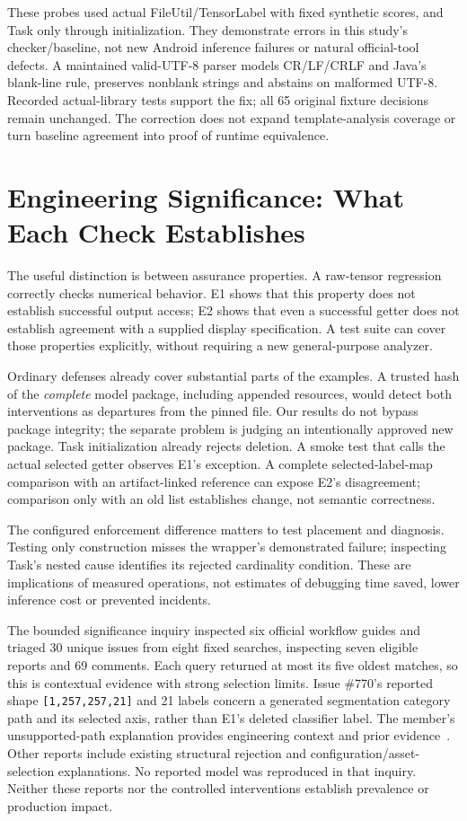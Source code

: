 \documentclass[10pt,twocolumn,letterpaper]{article}
\newcommand{\code}[1]{\texttt{#1}}
\begin{document}
These probes used actual FileUtil/TensorLabel with fixed synthetic scores, and Task only through initialization. They demonstrate errors in this study's checker/baseline, not new Android inference failures or natural official-tool defects. A maintained valid-UTF-8 parser models CR/LF/CRLF and Java's blank-line rule, preserves nonblank strings and abstains on malformed UTF-8. Recorded actual-library tests support the fix; all 65 original fixture decisions remain unchanged. The correction does not expand template-analysis coverage or turn baseline agreement into proof of runtime equivalence.

\section{Engineering Significance: What Each Check Establishes}
\label{sec:discussion}
The useful distinction is between assurance properties. A raw-tensor regression correctly checks numerical behavior. E1 shows that this property does not establish successful output access; E2 shows that even a successful getter does not establish agreement with a supplied display specification. A test suite can cover those properties explicitly, without requiring a new general-purpose analyzer.

Ordinary defenses already cover substantial parts of the examples. A trusted hash of the \emph{complete} model package, including appended resources, would detect both interventions as departures from the pinned file. Our results do not bypass package integrity; the separate problem is judging an intentionally approved new package. Task initialization already rejects deletion. A smoke test that calls the actual selected getter observes E1's exception. A complete selected-label-map comparison with an artifact-linked reference can expose E2's disagreement; comparison only with an old list establishes change, not semantic correctness.

The configured enforcement difference matters to test placement and diagnosis. Testing only construction misses the wrapper's demonstrated failure; inspecting Task's nested cause identifies its rejected cardinality condition. These are implications of measured operations, not estimates of debugging time saved, lower inference cost or prevented incidents.

The bounded significance inquiry inspected six official workflow guides and triaged 30 unique issues from eight fixed searches, inspecting seven eligible reports and 69 comments. Each query returned at most its five oldest matches, so this is contextual evidence with strong selection limits. Issue \#770's reported shape \code{[1,257,257,21]} and 21 labels concern a generated segmentation category path and its selected axis, rather than E1's deleted classifier label. The member's unsupported-path explanation provides engineering context and prior evidence~\cite{support770,support770reply}. Other reports include existing structural rejection and configuration/asset-selection explanations. No reported model was reproduced in that inquiry. Neither these reports nor the controlled interventions establish prevalence or production impact.
\end{document}
